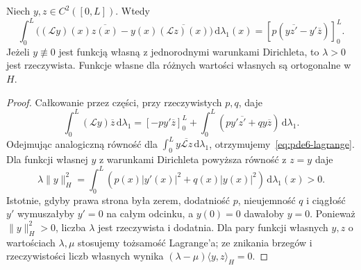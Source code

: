 \begin{lemat}
\label{lem:pde6-lagrange}
Niech $y,z\in C^2([0,L])$. Wtedy
\begin{equation}\label{eq:pde6-lagrange}
 \int_0^L\bigl((\mathcal Ly)(x)\overline{z(x)}
 -y(x)\overline{(\mathcal Lz)(x)}\bigr)\,\mathrm d\lambda_1(x)
 =\left[p\left(y\overline{z'}-y'\overline z\right)\right]_0^L.
\end{equation}
Jeżeli $y\not\equiv0$ jest funkcją własną
z jednorodnymi warunkami Dirichleta, to $\lambda>0$
jest rzeczywista. Funkcje własne dla różnych
wartości własnych są ortogonalne w $H$.
\end{lemat}
\begin{proof}
Całkowanie przez części, przy rzeczywistych $p,q$, daje
\[
 \int_0^L(\mathcal Ly)\overline z\,\mathrm d\lambda_1
 =[-py'\overline z]_0^L
 +\int_0^L(py'\overline{z'}+qy\overline z)\,
 \mathrm d\lambda_1.
\]
Odejmując analogiczną równość dla
$\int_0^L y\overline{\mathcal Lz}\,\mathrm d\lambda_1$,
otrzymujemy~\eqref{eq:pde6-lagrange}.
Dla funkcji własnej $y$ z warunkami Dirichleta
powyższa równość z $z=y$ daje
\[
 \lambda\|y\|_H^2
 =\int_0^L(p(x)|y'(x)|^2+q(x)|y(x)|^2)\,
 \mathrm d\lambda_1(x)>0.
\]
Istotnie, gdyby prawa strona była zerem, dodatniość $p$,
nieujemność $q$ i ciągłość $y'$ wymuszałyby $y'=0$
na całym odcinku, a $y(0)=0$ dawałoby $y=0$.
Ponieważ $\|y\|_H^2>0$, liczba $\lambda$ jest
rzeczywista i dodatnia.
Dla pary funkcji własnych $y,z$ o wartościach
$\lambda,\mu$ stosujemy tożsamość Lagrange'a;
ze znikania brzegów i rzeczywistości liczb własnych
wynika $(\lambda-\mu)\langle y,z\rangle_H=0$.
\end{proof}

